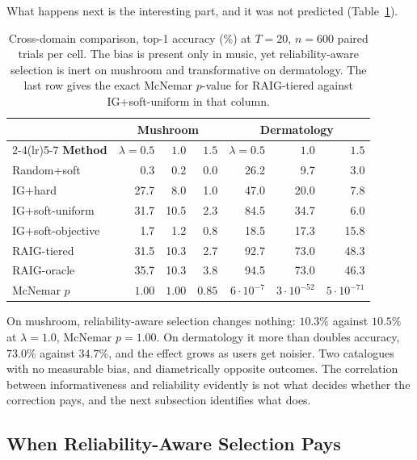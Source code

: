 What happens next is the interesting part, and it was not predicted
(Table~\ref{tab:domains}).

\begin{table}[t]
\caption{Cross-domain comparison, top-1 accuracy (\%) at $T=20$, $n=600$
paired trials per cell. The bias is present only in music, yet
reliability-aware selection is inert on mushroom and transformative on
dermatology. The last row gives the exact McNemar $p$-value for RAIG-tiered
against IG+soft-uniform in that column.}
\label{tab:domains}
\centering
\scriptsize
\begin{tabular}{@{}lrrrrrr@{}}
\toprule
& \multicolumn{3}{c}{\textbf{Mushroom}} & \multicolumn{3}{c}{\textbf{Dermatology}} \\
\cmidrule(lr){2-4}\cmidrule(lr){5-7}
\textbf{Method} & $\lambda{=}0.5$ & $1.0$ & $1.5$ & $\lambda{=}0.5$ & $1.0$ & $1.5$ \\
\midrule
Random+soft       & 0.3  & 0.2  & 0.0 & 26.2 & 9.7  & 3.0  \\
IG+hard           & 27.7 & 8.0  & 1.0 & 47.0 & 20.0 & 7.8  \\
IG+soft-uniform   & 31.7 & 10.5 & 2.3 & 84.5 & 34.7 & 6.0  \\
IG+soft-objective & 1.7  & 1.2  & 0.8 & 18.5 & 17.3 & 15.8 \\
RAIG-tiered       & 31.5 & 10.3 & 2.7 & 92.7 & 73.0 & 48.3 \\
RAIG-oracle       & 35.7 & 10.3 & 3.8 & 94.5 & 73.0 & 46.3 \\
\midrule
McNemar $p$ & $1.00$ & $1.00$ & $0.85$ &
  $6{\cdot}10^{-7}$ & $3{\cdot}10^{-52}$ & $5{\cdot}10^{-71}$ \\
\bottomrule
\end{tabular}
\end{table}

On mushroom, reliability-aware selection changes nothing: $10.3\%$ against
$10.5\%$ at $\lambda = 1.0$, McNemar $p = 1.00$. On dermatology it more than
doubles accuracy, $73.0\%$ against $34.7\%$, and the effect grows as users get
noisier. Two catalogues with no measurable bias, and diametrically opposite
outcomes. The correlation between informativeness and reliability evidently is
not what decides whether the correction pays, and the next subsection
identifies what does.

\subsection{When Reliability-Aware Selection Pays}
\label{sec:results-synthetic}

